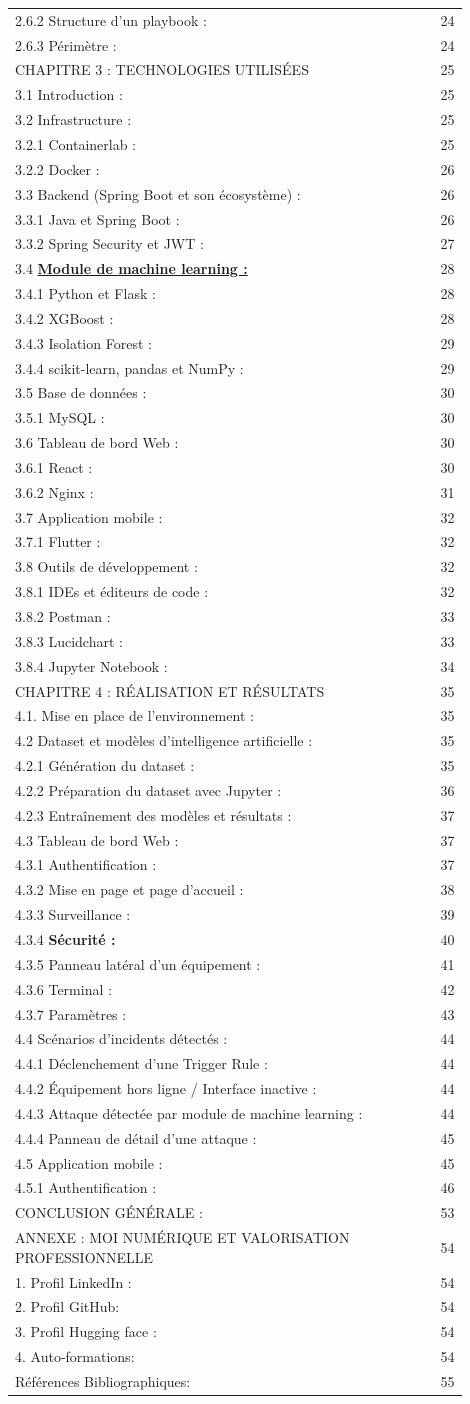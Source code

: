 \documentclass[12pt,a4paper]{report}
\newcommand{\tocrow}[2]{#1 \dotfill & #2\\}
\newcommand{\ub}[1]{\uline{\textbf{#1}}}
\begin{document}
\begin{longtable}{@{}p{0.90\linewidth}@{\hspace{0.5cm}}r@{}}
\tocrow{2.6.2 Structure d’un playbook :}{24}
\tocrow{2.6.3 Périmètre :}{24}
\tocrow{CHAPITRE 3 : TECHNOLOGIES UTILISÉES}{25}
\tocrow{3.1 Introduction :}{25}
\tocrow{3.2 Infrastructure :}{25}
\tocrow{3.2.1 Containerlab :}{25}
\tocrow{3.2.2 Docker :}{26}
\tocrow{3.3 Backend (Spring Boot et son écosystème) :}{26}
\tocrow{3.3.1 Java et Spring Boot :}{26}
\tocrow{3.3.2 Spring Security et JWT :}{27}
\tocrow{3.4 \ub{Module de machine learning :}}{28}
\tocrow{3.4.1 Python et Flask :}{28}
\tocrow{3.4.2 XGBoost :}{28}
\tocrow{3.4.3 Isolation Forest :}{29}
\tocrow{3.4.4 scikit-learn, pandas et NumPy :}{29}
\tocrow{3.5 Base de données :}{30}
\tocrow{3.5.1 MySQL :}{30}
\tocrow{3.6 Tableau de bord Web :}{30}
\tocrow{3.6.1 React :}{30}
\tocrow{3.6.2 Nginx :}{31}
\tocrow{3.7 Application mobile :}{32}
\tocrow{3.7.1 Flutter :}{32}
\tocrow{3.8 Outils de développement :}{32}
\tocrow{3.8.1 IDEs et éditeurs de code :}{32}
\tocrow{3.8.2 Postman :}{33}
\tocrow{3.8.3 Lucidchart :}{33}
\tocrow{3.8.4 Jupyter Notebook :}{34}
\tocrow{CHAPITRE 4 : RÉALISATION ET RÉSULTATS}{35}
\tocrow{4.1. Mise en place de l'environnement :}{35}
\tocrow{4.2 Dataset et modèles d'intelligence artificielle :}{35}
\tocrow{4.2.1 Génération du dataset :}{35}
\tocrow{4.2.2 Préparation du dataset avec Jupyter :}{36}
\tocrow{4.2.3 Entraînement des modèles et résultats :}{37}
\tocrow{4.3 Tableau de bord Web :}{37}
\tocrow{4.3.1 Authentification :}{37}
\tocrow{4.3.2 Mise en page et page d'accueil :}{38}
\tocrow{4.3.3 Surveillance :}{39}
\tocrow{4.3.4 \textbf{Sécurité :}}{40}
\tocrow{4.3.5 Panneau latéral d'un équipement :}{41}
\tocrow{4.3.6 Terminal :}{42}
\tocrow{4.3.7 Paramètres :}{43}
\tocrow{4.4 Scénarios d’incidents détectés :}{44}
\tocrow{4.4.1 Déclenchement d’une Trigger Rule :}{44}
\tocrow{4.4.2 Équipement hors ligne / Interface inactive :}{44}
\tocrow{4.4.3 Attaque détectée par module de machine learning :}{44}
\tocrow{4.4.4 Panneau de détail d’une attaque :}{45}
\tocrow{4.5 Application mobile :}{45}
\tocrow{4.5.1 Authentification :}{46}
\tocrow{CONCLUSION GÉNÉRALE :}{53}
\tocrow{ANNEXE : MOI NUMÉRIQUE ET VALORISATION PROFESSIONNELLE}{54}
\tocrow{1. Profil LinkedIn :}{54}
\tocrow{2. Profil GitHub:}{54}
\tocrow{3. Profil Hugging face :}{54}
\tocrow{4. Auto-formations:}{54}
\tocrow{Références Bibliographiques:}{55}
\end{longtable}
\endgroup
\clearpage
\end{document}
